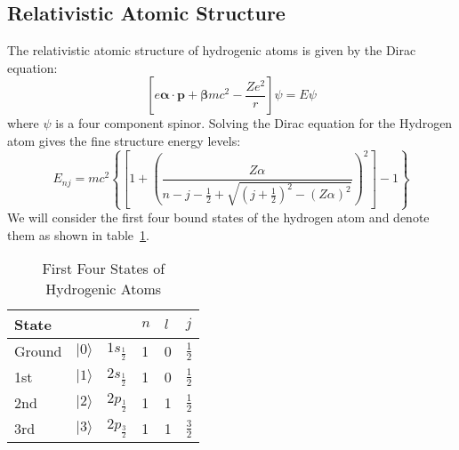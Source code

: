 \documentclass[a4paper,titlepage]{report}
\newcommand{\mb}[1]{\mathbf{#1}}
\newcommand{\ket}[1]{|#1 \rangle}
\begin{document}
	\subsection{Relativistic Atomic Structure}
		The relativistic atomic structure of hydrogenic atoms is given
		by the Dirac equation:
		\begin{equation}
			[ e \mb{\alpha} \cdot \mb{p} + \mb{\beta}mc^2 - \frac{Ze^2}{r}] \psi = E\psi
		\end{equation}
		where $\psi$ is a four component spinor.
		Solving the Dirac equation for the Hydrogen atom gives the fine
		structure energy levels:
		\begin{equation}
			E_{nj} = mc^2 \left\{
					\left[
						1 + 
						\left(
							\frac{Z \alpha}
								 {n - j - \frac{1}{2} + 
								  \sqrt{(j+\frac{1}{2})^2 - (Z \alpha)^2 } }
						\right)^2
					\right] - 1
					\right\}
		\end{equation}
		We will consider the first four bound states of the hydrogen
		atom and denote them as shown in table~\ref{tbl:hstates}.
\begin{table} 
\begin{center}
\begin{tabularx}{\linewidth}{|X|X|X|X|X|X|}	\hline 
State 	& 				& 					    & $n$ & $l$ & $j$ \\ \hline \hline
Ground	&	$\ket{0}$	& $1s_{\frac{1}{2}}$	& 1   & 0   & $\frac{1}{2}$ \\ 
1st		&	$\ket{1}$ 	& $2s_{\frac{1}{2}}$	& 1   & 0   & $\frac{1}{2}$ \\ 
2nd		&	$\ket{2}$	& $2p_{\frac{1}{2}}$	& 1   & 1   & $\frac{1}{2}$ \\ 
3rd		&	$\ket{3}$	& $2p_{\frac{3}{2}}$	& 1   & 1   & $\frac{3}{2}$ \\ \hline
\end{tabularx}
\caption{First Four States of Hydrogenic Atoms}
\label{tbl:hstates}
\end{center}
\end{table}
\end{document}
